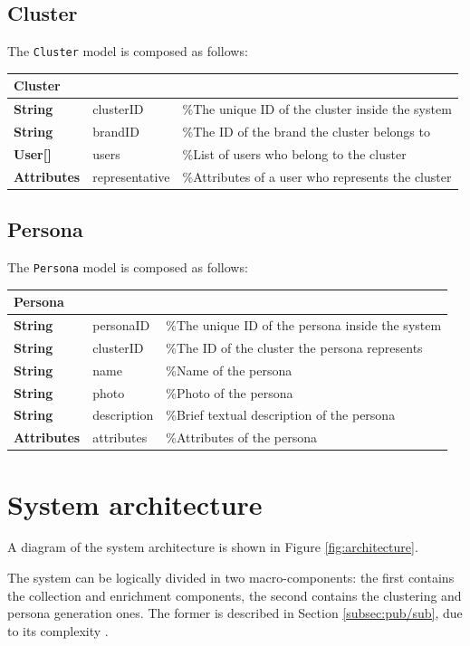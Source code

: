 \subsection{Cluster}
The \texttt{Cluster} model is composed as follows:
\begin{center}
\begin{tabular}{lll}
\hline
Cluster & & \\
\hline
\textbf{String} & clusterID & \%The unique ID of the cluster inside the system \\
\textbf{String} & brandID & \%The ID of the brand the cluster belongs to \\
\textbf{User[]} & users & \%List of users who belong to the cluster \\
\textbf{Attributes} & representative & \%Attributes of a user who represents the cluster \\
\hline
\end{tabular}
\end{center}

\subsection{Persona}
The \texttt{Persona} model is composed as follows:
\begin{center}
\begin{tabular}{lll}
\hline
Persona & & \\
\hline
\textbf{String} & personaID & \%The unique ID of the persona inside the system \\
\textbf{String} & clusterID & \%The ID of the cluster the persona represents \\
\textbf{String} & name & \%Name of the persona \\
\textbf{String} & photo & \%Photo of the persona \\
\textbf{String} & description & \%Brief textual description of the persona \\
\textbf{Attributes} & attributes & \%Attributes of the persona \\
\hline
\end{tabular}
\end{center}

\section{System architecture}
A diagram of the system architecture is shown in Figure \ref{fig:architecture}.

The system can be logically divided in two macro-components: the first contains the collection and enrichment components, the second contains the clustering and persona generation ones. The former is described in Section \ref{subsec:pub/sub}, due to its complexity .

